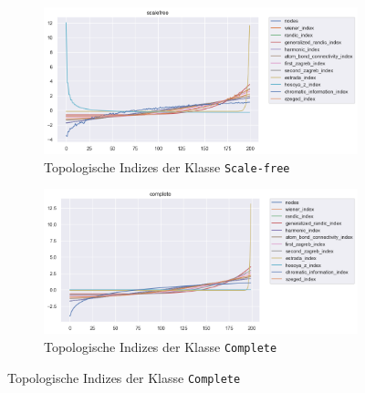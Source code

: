 {\begin{minipage}{\textwidth}
\begin{figure}[H]
            \begin{subfigure}{.45\textwidth}
                \includegraphics[width=\textwidth]{images/30_results/scalefree-ti-comparison.png}
                \caption{Topologische Indizes der Klasse \texttt{Scale-free}}
                \label{fig:ti-comparison-scalefree}
            \end{subfigure}%
            \hspace*{\fill}
            \begin{subfigure}{.45\textwidth}
                \includegraphics[width=\textwidth]{images/30_results/complete-ti-comparison.png}
                \caption{Topologische Indizes der Klasse \texttt{Complete}}
                \label{fig:ti-comparison-complete}
            \end{subfigure}


\end{figure}
\end{minipage}}

